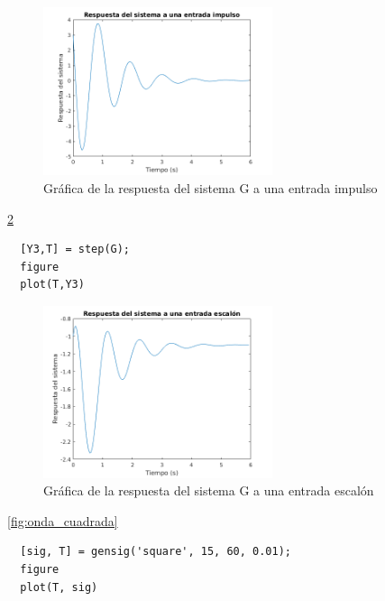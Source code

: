 \documentclass[12pt,letterpaper]{article}
\begin{document}
\begin{figure}[ht!]
	\centering
	\includegraphics[width=0.6\textwidth]{pictures/Ejercicio5/respuesta_impulso}
	\caption{Gráfica de la respuesta del sistema G a una entrada impulso}
	\label{fig:respuesta_impulso}
\end{figure} 




\ref{fig:respuesta_escalon}

\begin{lstlisting}[style=Matlab-editor, basicstyle=\mlttfamily]
  % Respuesta a una entrada escalon
  [Y3,T] = step(G);
  figure
  plot(T,Y3)
\end{lstlisting}

\begin{figure}[ht!]
	\centering
	\includegraphics[width=0.6\textwidth]{pictures/Ejercicio5/respuesta_escalon}
	\caption{Gráfica de la respuesta del sistema G a una entrada escalón}
	\label{fig:respuesta_escalon}
\end{figure} 




\ref{fig:onda_cuadrada}

\begin{lstlisting}[style=Matlab-editor, basicstyle=\mlttfamily]
  % Onda cuadrada
  [sig, T] = gensig('square', 15, 60, 0.01);
  figure
  plot(T, sig)
\end{lstlisting}
\end{document}
